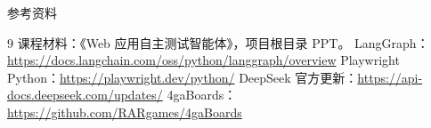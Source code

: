 \begin{frame}{参考资料}
\footnotesize
\begin{thebibliography}{9}
 课程材料：《Web 应用自主测试智能体》，项目根目录 PPT。
 LangGraph：\url{https://docs.langchain.com/oss/python/langgraph/overview}
 Playwright Python：\url{https://playwright.dev/python/}
 DeepSeek 官方更新：\url{https://api-docs.deepseek.com/updates/}
 4gaBoards：\url{https://github.com/RARgames/4gaBoards}
\end{thebibliography}
\end{frame}
